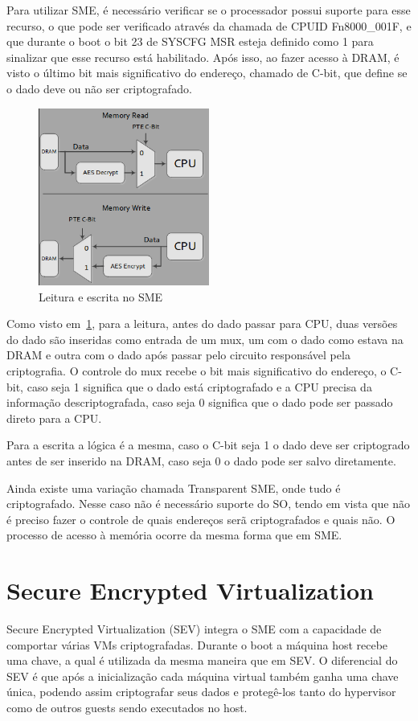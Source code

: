 \documentclass{report}
\begin{document}
Para utilizar SME, é necessário verificar se o processador possui suporte para
esse recurso, o que pode ser verificado através da chamada de CPUID
Fn8000\_001F, e que durante o boot o bit 23 de SYSCFG MSR esteja definido como
1 para sinalizar que esse recurso está habilitado. Após isso, ao fazer acesso à
DRAM, é visto o último bit mais significativo do endereço, chamado de C-bit,
que define se o dado deve ou não ser criptografado.

\begin{figure}[h]
    \centering
    \includegraphics[width=0.5\textwidth]{img/sme_read_write_architecture}
    \caption{Leitura e escrita no SME}\label{sme-read-write}
\end{figure}

Como visto em~\ref{sme-read-write}, para a leitura, antes do dado passar para
CPU, duas versões do dado são inseridas como entrada de um mux, um com o dado
como estava na DRAM e outra com o dado após passar pelo circuito responsável
pela criptografia. O controle do mux recebe o bit mais significativo do
endereço, o C-bit, caso seja 1 significa que o dado está criptografado e a CPU
precisa da informação descriptografada, caso seja 0 significa que o dado pode
ser passado direto para a CPU\@.

Para a escrita a lógica é a mesma, caso o C-bit seja 1 o dado deve ser
criptogrado antes de ser inserido na DRAM, caso seja 0 o dado pode ser salvo
diretamente.

Ainda existe uma variação chamada Transparent SME, onde tudo é criptografado.
Nesse caso não é necessário suporte do SO, tendo em vista que não é preciso
fazer o controle de quais endereços serã criptografados e quais não. O processo
de acesso à memória ocorre da mesma forma que em SME\@.


\section{Secure Encrypted Virtualization}
Secure Encrypted Virtualization (SEV) integra o SME com a capacidade de
comportar várias VMs criptografadas. Durante o boot a máquina host recebe uma
chave, a qual é utilizada da mesma maneira que em SEV. O diferencial do SEV é
que após a inicialização cada máquina virtual também ganha uma chave única,
podendo assim criptografar seus dados e protegê-los tanto do hypervisor como de
outros guests sendo executados no host.
\end{document}
